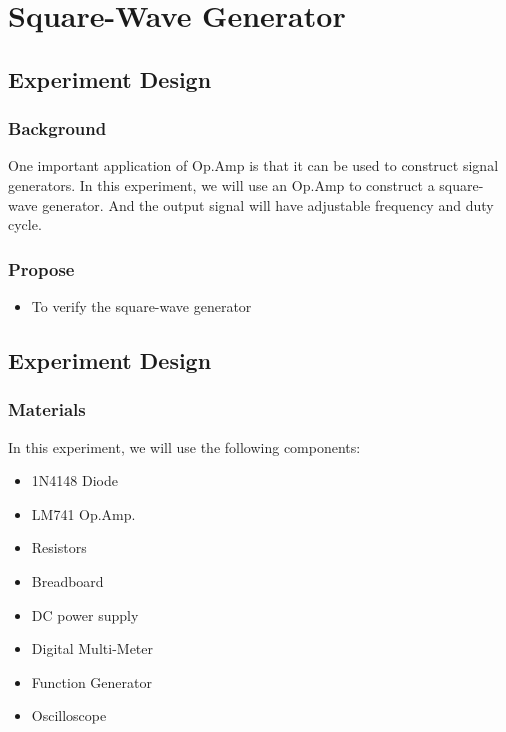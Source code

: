 \section{Square-Wave Generator}

\subsection{Experiment Design}
    \subsubsection{Background}
        One important application of Op.Amp is that it can be used to construct signal generators. In this experiment, we will use an Op.Amp to construct a square-wave generator. And the output signal will have adjustable frequency and duty cycle.\par

    \subsubsection{Propose}
    \begin{itemize}
        \item To verify the square-wave generator
    \end{itemize}

\subsection{Experiment Design}
    \subsubsection{Materials}
        In this experiment, we will use the following components:
        \begin{itemize}
            \item 1N4148 Diode
            \item LM741 Op.Amp.
            \item Resistors
            \item Breadboard
            \item DC power supply
            \item Digital Multi-Meter
            \item Function Generator
            \item Oscilloscope
        \end{itemize}


